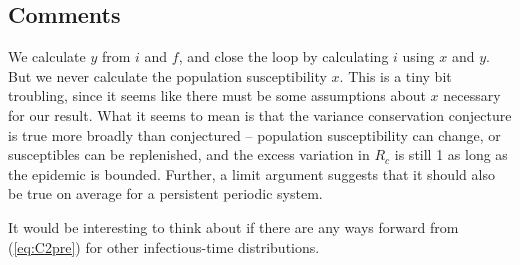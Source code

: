 \documentclass[12pt]{article}
\newcommand{\eqref}[1]{(\ref{eq:#1})}
\begin{document}
\subsection*{Comments}

We calculate $y$ from $i$ and $f$, and close the loop by calculating $i$ using $x$ and $y$. But we never calculate the population susceptibility $x$. This is a tiny bit troubling, since it seems like there must be some assumptions about $x$ necessary for our result. What it seems to mean is that the variance conservation conjecture is true more broadly than conjectured – population susceptibility can change, or susceptibles can be replenished, and the excess variation in $R_c$ is still 1 as long as the epidemic is bounded. Further, a limit argument suggests that it should also be true on average for a persistent periodic system.

It would be interesting to think about if there are any ways forward from \eqref{C2pre} for other infectious-time distributions.
\end{document}
